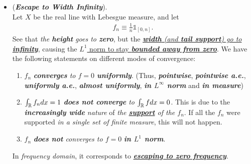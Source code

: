 \documentclass[11pt]{article}
\begin{document}
\begin{itemize}
\item \begin{example} (\emph{\textbf{Escape to Width Infinity}}).\\
Let $X$ be the real line with Lebesgue measure, and let
\begin{align*}
f_n \equiv \frac{1}{n}\mathds{1}_{[0,n]}.
\end{align*} See that \emph{the \textbf{height} goes to \textbf{zero}}, but the \underline{\emph{\textbf{width} (and \textbf{tail support}) go to \textbf{infinity}}}, causing the \underline{$L^1$ norm to stay \textbf{\emph{bounded away from zero}}}. We have the following statements on different modes of convergence:
\begin{enumerate}
\item  $f_n$ \emph{\textbf{converges}  to $f = 0$ \textbf{uniformly}}. (Thus,  \emph{\textbf{pointwise}}, \emph{\textbf{pointwise a.e.}}, \emph{\textbf{uniformly a.e.}}, \emph{\textbf{almost uniformly}}, \emph{\textbf{in $L^{\infty}$ norm}} and \emph{\textbf{in measure}})
\item $\int_{{\mathbb R}}f_{n} dx = 1$ \emph{\textbf{does not converge} to $\int_{{\mathbb R}} f dx = 0$}. 
This is due to the \emph{\textbf{increasingly wide} nature} of \emph{the \underline{\textbf{support}} of the $f_n$}. If all the $f_n$ were supported \emph{in a single set of finite measure}, this will not happen. 
\item $f_n$ \emph{\textbf{does not} converges to $f = 0$} \emph{\textbf{in $L^1$ norm}}. 
\end{enumerate}   In \emph{frequency domain}, it corresponds to \emph{\textbf{\underline{escaping to zero frequency}}}. 
\end{example}


\end{itemize}
\end{document}
